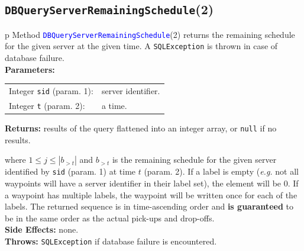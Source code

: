 \subsection{{\tt{}\protect{}DBQueryServerRemainingSchedule}(2)}
\begin{tabular}{p{\textwidth}}
\toprule
{}
Method \textcolor{blue}{{\tt{}\protect{}DBQueryServerRemainingSchedule}}(2) returns the
remaining schedule for the given server at the given time.
A {\tt{}SQLException} is thrown in case of database failure.\\
\midrule
\textbf{Parameters:} \\
\begin{tabular}{lp{116mm}}
Integer {\tt{}sid} (param. 1):&server identifier.\\
Integer {\tt{}t} (param. 2):&a time.\\
\end{tabular}
\textbf{Returns:} results of the query flattened into an integer array,
or {\tt{}null} if no results.


where $1\leq j\leq |b_{>t}|$ and $b_{>t}$ is the remaining schedule for the
given server identified by {\tt{}sid} (param. 1) at time $t$ (param. 2).
If a label is empty (\textit{e.g.} not all waypoints will have a server
identifier in their label set), the element will be 0. If a waypoint has
multiple labels, the waypoint will be written once for each of the labels.
The returned sequence is in time-ascending order and \textbf{is guaranteed}
to be in the same order as the actual pick-ups and drop-offs.\\
\textbf{Side Effects:} none.\\
\textbf{Throws:} {\tt{}SQLException} if database failure is encountered.\\
\bottomrule
\end{tabular}
